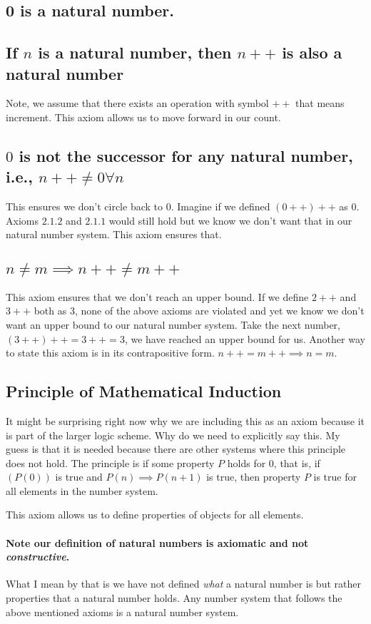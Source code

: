 \documentclass{report}
\begin{document}
\subsection{0 is a natural number.}
\subsection{If $n$ is a natural number, then $n++$ is also a natural number}
Note, we assume that there exists an operation with symbol $++$ that means increment. This axiom allows us to move forward in our count.
\subsection{$0$ is not the successor for any natural number, i.e., $n++ \neq 0 \forall n$}
This ensures we don't circle back to $0$. Imagine if we defined  $\left( 0++ \right) ++ $ as $0$. Axioms $2.1.2$ and $2.1.1$ would still hold but we know we don't want that in our natural number system. This axiom ensures that. 
\subsection{$n \neq m \implies n++ \neq m++$}
This axiom ensures that we don't reach an upper bound. If we define $2++$ and  $3++$ both as $3$, none of the above axioms are violated and yet we know we don't want an upper bound to our natural number system. Take the next number, $(3++)++ = 3++ = 3$, we have reached an upper bound for us.
Another way to state this axiom is in its contrapositive form. $n++ = m++ \implies n = m$.
\subsection{Principle of Mathematical Induction}
It might be surprising right now why we are including this as an axiom because it is part of the larger logic scheme. Why do we need to explicitly say this. My guess is that it is needed because there are other systems where this principle does not hold. 
The principle is if some property $P$ holds for $0$, that is, if $\left( P\left( 0 \right)  \right) $ is true and  $P\left( n \right) \implies P\left( n+1 \right) $ is true, then property $P$ is true for all elements in the number system. 

This axiom allows us to define properties of objects for all elements.

\paragraph{Note our definition of natural numbers is axiomatic and not \textit{constructive}.} What I mean by that is we have not defined \textit{what} a natural number is but rather properties that a natural number holds. Any number system that follows the above mentioned axioms is a natural number system.
\end{document}
